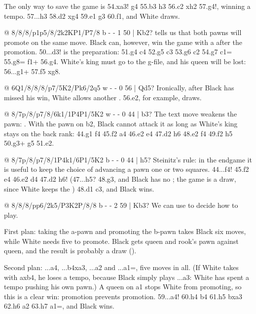 The only way to save the game is 54.\K xa3! \K g4 55.\K b3 \K h3 56.\K c2 \K xh2 57.g4!, winning a
tempo. 57...\K h3 58.\K d2 \K xg4 59.\K e1 \K g3 60.\K f1, and White draws.

@ 8/8/8/p1p5/8/2k2KP1/P7/8 b - - 1 50 | Kb2?
 tells us that both pawns will promote on
the same move. Black can, however, win the game with a  after the
promotion. 50...\K d3! is the preparation: 51.g4 c4 52.g5 c3 53.g6 c2 54.g7 c1=\Q{} 55.g8=\Q{} \Q f1+
56.\K g4. White's king must go to the g-file, and his queen will be lost: 56...\Q g1+ 57.\K f5
\Q xg8.

@ 6Q1/8/8/8/p7/5K2/Pk6/2q5 w - - 0 56 | Qd5?
Ironically, after Black has missed his win, White allows another .
56.\K e2, for example, draws.

@ 8/7p/8/p7/8/6k1/1P4P1/5K2 w - - 0 44 | b3?
The text move weakens the pawn: .
With the pawn on b2, Black cannot attack it as long as White's king stays on the back rank: 44.\K g1
\K f4 45.\K f2 a4 46.\K e2 \K e4 47.\K d2 h6 48.\K e2 \K f4 49.\K f2 h5 50.g3+ \K g5 51.\K e2.

@ 8/7p/8/p7/8/1P4k1/6P1/5K2 b - - 0 44 | h5?
Steinitz's rule: in the endgame it is useful to keep the choice of advancing a pawn one or two
squares. 44...\K f4! 45.\K f2 \K e4 46.\K e2 \K d4
47.\K d2 h6! (47...h5? 48.g3, and Black has no ;
the game is a draw, since White keeps the )
48.\K d1 \K c3, and Black wins.

@ 8/8/8/pp6/2k5/P3K2P/8/8 b - - 2 59 | Kb3?
We can use  to decide how to play.

First plan: taking the a-pawn and promoting the b-pawn takes Black six moves, while White needs five
to promote. Black gets queen and rook's pawn against queen, and the result is probably a draw
().

Second plan: ...a4, ...b4xa3, ...a2 and ...a1=\Q, five moves in all. (If White takes with axb4, he
loses a tempo, because Black simply plays ...a3: White has spent a tempo pushing his own pawn.) A
queen on a1 stops White from promoting, so this is a clear win: promotion prevents
promotion. 59...a4! 60.h4 b4 61.h5 bxa3 62.h6 a2 63.h7
a1=\Q, and Black wins.

